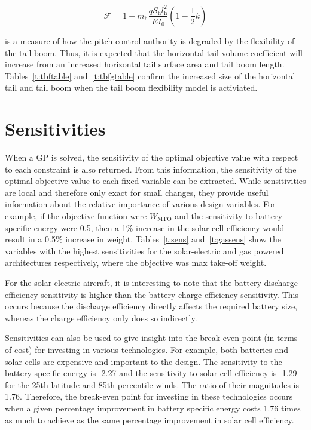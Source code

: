 \begin{equation}
     \mathcal{F} = 1 + m_{\text{h}} \frac{qS_{\text{h}}l_{\text{h}}^2}{EI_0}(1-\frac{1}{2}k) 
\end{equation}

is a measure of how the pitch control authority is degraded by the flexibility of the tail boom. 
Thus, it is expected that the horizontal tail volume coefficient will increase from an increased horizontal tail surface area and tail boom length. 
Tables~\ref{t:tbftable} and~\ref{t:tbfgtable} confirm the increased size of the horizontal tail and tail boom when the tail boom flexibility model is activiated. 




\section{Sensitivities}

When a GP is solved, the sensitivity of the optimal objective value with respect to each constraint is also returned.  
From this information, the sensitivity of the optimal objective value to each fixed variable can be extracted.\cite{hoburgthesis} 
While sensitivities are local and therefore only exact for small changes, they provide useful information about the relative importance of various design variables. 
For example, if the objective function were $W_{\text{MTO}}$ and the sensitivity to battery specific energy were 0.5, then a 1\% increase in the solar cell efficiency would result in a 0.5\% increase in weight.  
Tables~\ref{t:sens} and~\ref{t:gassens} show the variables with the highest sensitivities for the solar-electric and gas powered architectures respectively, where the objective was max take-off weight.

For the solar-electric aircraft, it is interesting to note that the battery discharge efficiency sensitivity is higher than the battery charge efficiency sensitivity.
This occurs because the discharge efficiency directly affects the required battery size, whereas the charge efficiency only does so indirectly. 

Sensitivities can also be used to give insight into the break-even point (in terms of cost) for investing in various technologies.  
For example, both batteries and solar cells are expensive and important to the design.  
The sensitivity to the battery specific energy is -2.27 and the sensitivity to solar cell efficiency is -1.29 for the 25th latitude and 85th percentile winds. 
The ratio of their magnitudes is 1.76.  
Therefore, the break-even point for investing in these technologies occurs when a given percentage improvement in battery specific energy costs 1.76 times as much to achieve as the same percentage improvement in solar cell efficiency. 

\footnotesize




